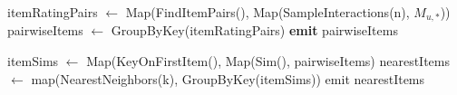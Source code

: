 \begin{algorithm}
\begin{algorithmic}[1]
            
            \State itemRatingPairs $\leftarrow$ Map(FindItemPairs(), Map(SampleInteractions(n), $M_{u, *}$))
            \State pairwiseItems $\leftarrow$ GroupByKey(itemRatingPairs)
            \State \textbf{emit} pairwiseItems
            \EndFunction
            
                \State itemSims $\leftarrow$ Map(KeyOnFirstItem(), Map(Sim(), pairwiseItems)
                \State nearestItems $\leftarrow$ map(NearestNeighbors(k), GroupByKey(itemSims))
                \State emit nearestItems
            \EndFunction
        \end{algorithmic}
    \end{algorithm}
    
